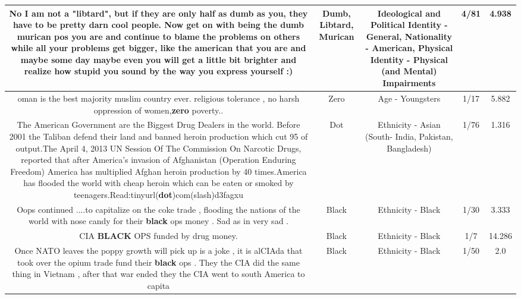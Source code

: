 \documentclass[11pt]{article}
\newlength\mylength
\begin{document}
\begin{center}
\begin{longtable}{|C{.65\mylength}|C{.30\mylength}|C{.12\mylength}|C{.12\mylength}|C{.12\mylength}|}
  \small No I am not a "\textbf{libtard}", but if they are only half as \textbf{dumb} as you, they have to be pretty darn cool people. Now get on with being the \textbf{dumb} \textbf{murican} pos you are and continue to blame the problems on others while all your problems get bigger, like the american that you are and maybe some day maybe even you will get a little bit brighter and realize how stupid you sound by the way you express yourself :)\normalsize   & Dumb, Libtard, Murican &  Ideological and Political Identity - General, Nationality - American, Physical Identity - Physical (and Mental) Impairments & 4/81 & 4.938 \\  \hline
  \small oman is the best majority muslim country ever. religious tolerance , no harsh oppression of women,\textbf{zero} poverty..\normalsize   & Zero & Age - Youngsters & 1/17 & 5.882 \\  \hline
  \small The American Government are the Biggest Drug Dealers in the world. Before 2001 the Taliban defend their land and banned heroin production which cut 95 of output.The April 4, 2013 UN Session Of The Commission On Narcotic Drugs, reported that after America's invasion of Afghanistan (Operation Enduring Freedom) America has multiplied Afghan heroin production by 40 times.America has flooded the world with cheap heroin which can be eaten or smoked by teenagers.Read:tinyurl(\textbf{dot})com(slash)d3fagxu\normalsize   & Dot & Ethnicity - Asian (South- India, Pakistan, Bangladesh) & 1/76 & 1.316 \\  \hline
  \small Oops continued ....to capitalize on the coke trade , flooding the nations of the world with nose candy for their \textbf{black} ops money . Sad as in very sad .\normalsize   & Black & Ethnicity - Black & 1/30 & 3.333 \\  \hline
  \small CIA \textbf{BLACK} OPS funded by drug money.\normalsize   & Black & Ethnicity - Black & 1/7 & 14.286 \\  \hline
  \small Once NATO leaves the poppy growth will pick up is a joke , it is alCIAda  that took over the opium trade  fund their \textbf{black} ops . They the CIA did the same thing in Vietnam , after that war ended they the CIA went to south America to capita\normalsize   & Black & Ethnicity - Black & 1/50 & 2.0 \\  \hline

\end{longtable}
\end{center}
\end{document}
